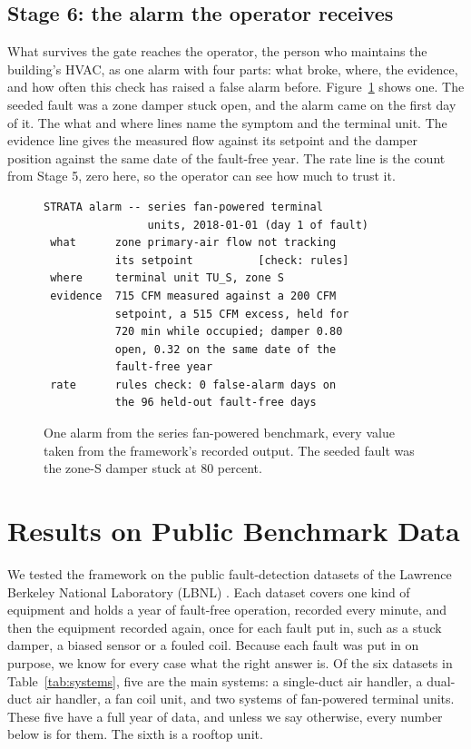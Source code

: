 \documentclass[conference]{IEEEtran}
\begin{document}
\subsection{Stage 6: the alarm the operator receives}

What survives the gate reaches the operator, the person who maintains the building's HVAC, as one alarm with four parts: what broke, where, the evidence, and how often this check has raised a false alarm before. Figure~\ref{fig:alarm} shows one. The seeded fault was a zone damper stuck open, and the alarm came on the first day of it. The what and where lines name the symptom and the terminal unit. The evidence line gives the measured flow against its setpoint and the damper position against the same date of the fault-free year. The rate line is the count from Stage 5, zero here, so the operator can see how much to trust it.

\begin{figure}[t]
\scriptsize
\begin{verbatim}
STRATA alarm -- series fan-powered terminal
                units, 2018-01-01 (day 1 of fault)
 what      zone primary-air flow not tracking
           its setpoint          [check: rules]
 where     terminal unit TU_S, zone S
 evidence  715 CFM measured against a 200 CFM
           setpoint, a 515 CFM excess, held for
           720 min while occupied; damper 0.80
           open, 0.32 on the same date of the
           fault-free year
 rate      rules check: 0 false-alarm days on
           the 96 held-out fault-free days
\end{verbatim}
\caption{One alarm from the series fan-powered benchmark, every value taken from the framework's recorded output. The seeded fault was the zone-S damper stuck at 80 percent.}
\label{fig:alarm}
\end{figure}

\section{Results on Public Benchmark Data}
\label{sec:results}

We tested the framework on the public fault-detection datasets of the Lawrence Berkeley National Laboratory (LBNL) \cite{granderson2023lbnlfdddata}. Each dataset covers one kind of equipment and holds a year of fault-free operation, recorded every minute, and then the equipment recorded again, once for each fault put in, such as a stuck damper, a biased sensor or a fouled coil. Because each fault was put in on purpose, we know for every case what the right answer is. Of the six datasets in Table~\ref{tab:systems}, five are the main systems: a single-duct air handler, a dual-duct air handler, a fan coil unit, and two systems of fan-powered terminal units. These five have a full year of data, and unless we say otherwise, every number below is for them. The sixth is a rooftop unit.
\end{document}
